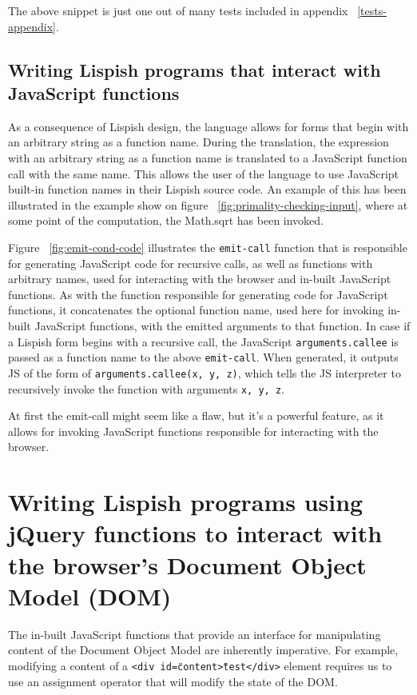 The above snippet is just one out of many tests included in appendix ~\ref{tests-appendix}. 

\subsection{Writing Lispish programs that interact with JavaScript functions}
As a consequence of Lispish design, the language allows for forms that begin with an arbitrary string as a function name. During the translation, the expression with an arbitrary string as a function name is translated to a JavaScript function call with the same name. This allows the user of the language to use JavaScript built-in function names in their Lispish source code. An example of this has been illustrated in the example show on figure ~\ref{fig:primality-checking-input}, where at some point of the computation, the Math.sqrt has been invoked. 



Figure ~\ref{fig:emit-cond-code} illustrates the \texttt{emit-call} function that is responsible for generating JavaScript code for recursive calls, as well as functions with arbitrary names, used for interacting with the browser and in-built JavaScript functions. 
As with the function responsible for generating code for JavaScript functions, it concatenates the optional function name, used here for invoking in-built JavaScript functions, with the emitted arguments to that function.
In case if a Lispish form begins with a recursive call, the JavaScript \texttt{arguments.callee} is passed as a function name to the above \texttt{emit-call}.
When generated, it outputs JS of the form of \texttt{arguments.callee(x, y, z)}, which tells the JS interpreter to recursively invoke the function with arguments \texttt{x, y, z}.

At first the emit-call might seem like a flaw, but it's a powerful feature, as it allows for invoking JavaScript functions responsible for interacting with the browser. 

\section{Writing Lispish programs using jQuery functions to interact with the browser's Document Object Model (DOM)}\label{DOM}
The in-built JavaScript functions that provide an interface for manipulating content of the Document Object Model are inherently imperative.
For example, modifying a content of a \texttt{<div id=\"content\">test</div>} element requires us to use an assignment operator that will modify the state of the DOM. 

